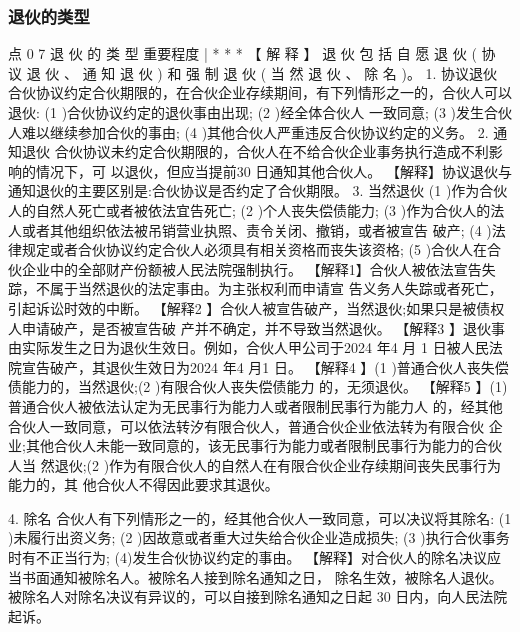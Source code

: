 \documentclass[UTF8,12pt]{ctexart}
\numberwithin{equation}{section} %
\numberwithin{figure}{section}
\numberwithin{table}{section}
\begin{document}
	\subsubsection{退伙的类型}
	 点 0 7 退 伙 的 类 型 重要程度 | * * *
	【 解 释 】 退 伙 包 括 自 愿 退 伙 ( 协 议 退 伙 、 通 知 退 伙 ) 和 强 制 退 伙 ( 当 然 退 伙 、 除 名 )。
	1. 协议退伙 合伙协议约定合伙期限的，在合伙企业存续期间，有下列情形之一的，合伙人可以退伙: (1 )合伙协议约定的退伙事由出现;
	(2 )经全体合伙人 一致同意;
	(3 )发生合伙人难以继续参加合伙的事由;
	(4 )其他合伙人严重违反合伙协议约定的义务。
	2. 通知退伙 合伙协议未约定合伙期限的，合伙人在不给合伙企业事务执行造成不利影响的情况下，可 以退伙，但应当提前30 日通知其他合伙人。 【解释】协议退伙与通知退伙的主要区别是:合伙协议是否约定了合伙期限。
	3. 当然退伙
	(1 )作为合伙人的自然人死亡或者被依法宜告死亡;
	(2 )个人丧失偿债能力;
	(3 )作为合伙人的法人或者其他组织依法被吊销营业执照、责令关闭、撤销，或者被宣告 破产;
	(4 )法律规定或者合伙协议约定合伙人必须具有相关资格而丧失该资格;
	(5 )合伙人在合伙企业中的全部财产份额被人民法院强制执行。
	【解释1】合伙人被依法宣告失踪，不属于当然退伙的法定事由。为主张权利而申请宣 告义务人失踪或者死亡，引起诉讼时效的中断。
	【解释2 】合伙人被宣告破产，当然退伙;如果只是被债权人申请破产，是否被宣告破 产并不确定，并不导致当然退伙。
	【解释3 】退伙事由实际发生之日为退伙生效日。例如，合伙人甲公司于2024 年4 月 1 日被人民法院宣告破产，其退伙生效日为2024 年4 月1 日。
	【解释4 】(1 )普通合伙人丧失偿债能力的，当然退伙;(2 )有限合伙人丧失偿债能力 的，无须退伙。
	【解释5 】(1)普通合伙人被依法认定为无民事行为能力人或者限制民事行为能力人 的，经其他合伙人一致同意，可以依法转汐有限合伙人，普通合伙企业依法转为有限合伙 企业;其他合伙人未能一致同意的，该无民事行为能力或者限制民事行为能力的合伙人当 然退伙;(2 )作为有限合伙人的自然人在有限合伙企业存续期间丧失民事行为能力的，其 他合伙人不得因此要求其退伙。
	
	4. 除名 合伙人有下列情形之一的，经其他合伙人一致同意，可以决议将其除名: (1 )未履行出资义务;
	(2 )因故意或者重大过失给合伙企业造成损失; (3 )执行合伙事务时有不正当行为; (4)发生合伙协议约定的事由。
	【解释】对合伙人的除名决议应当书面通知被除名人。被除名人接到除名通知之日， 除名生效，被除名人退伙。被除名人对除名决议有异议的，可以自接到除名通知之日起 30 日内，向人民法院起诉。
	
	
	
\end{document}
